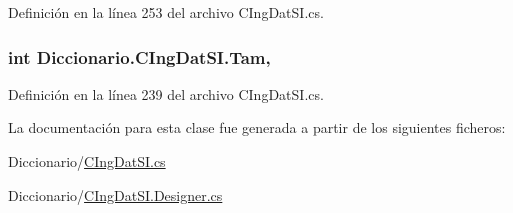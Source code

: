 Definición en la línea 253 del archivo C\-Ing\-Dat\-S\-I.\-cs.

\hypertarget{class_diccionario_1_1_c_ing_dat_s_i_a594cbf91978c353db732e094f0224b17}{
\subsubsection[{Tam}]{\setlength{\rightskip}{0pt plus 5cm}int Diccionario.\-C\-Ing\-Dat\-S\-I.\-Tam\hspace{0.3cm}{\ttfamily [get]}, {\ttfamily [set]}}}\label{class_diccionario_1_1_c_ing_dat_s_i_a594cbf91978c353db732e094f0224b17}


Definición en la línea 239 del archivo C\-Ing\-Dat\-S\-I.\-cs.



La documentación para esta clase fue generada a partir de los siguientes ficheros\-:\begin{DoxyCompactItemize}
\item 
Diccionario/\hyperlink{_c_ing_dat_s_i_8cs}{C\-Ing\-Dat\-S\-I.\-cs}\item 
Diccionario/\hyperlink{_c_ing_dat_s_i_8_designer_8cs}{C\-Ing\-Dat\-S\-I.\-Designer.\-cs}\end{DoxyCompactItemize}

